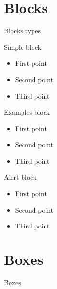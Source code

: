 \documentclass{IFES-beamer}
\begin{document}
\section{Blocks}
\begin{frame}{Blocks types}

\begin{block}{Simple block}
\begin{itemize}
  \item First point
  \item Second point
  \item Third point
\end{itemize}
\end{block}

\begin{exampleblock}{Examples block}
\begin{itemize}
  \item First point
  \item Second point
  \item Third point
\end{itemize}
\end{exampleblock}

\begin{alertblock}{Alert block}
\begin{itemize}
  \item First point
  \item Second point
  \item Third point
\end{itemize}
\end{alertblock}
\end{frame}

\section{Boxes}

\begin{frame}{Boxes}









\end{frame}
\end{document}
